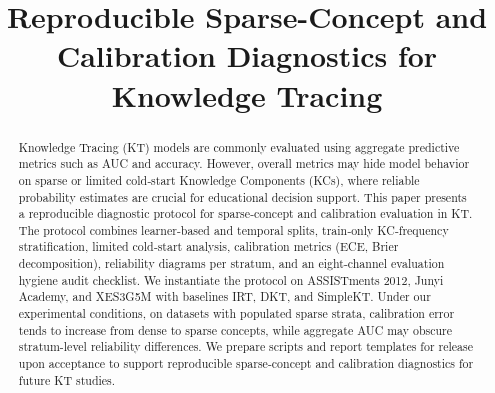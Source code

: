 \documentclass[conference]{IEEEtran}
\begin{document}
\title{Reproducible Sparse-Concept and Calibration Diagnostics for Knowledge Tracing\\
}

\author{
}


\maketitle

\begin{abstract}
Knowledge Tracing (KT) models are commonly evaluated using aggregate predictive metrics such as AUC and accuracy. However, overall metrics may hide model behavior on sparse or limited cold‑start Knowledge Components (KCs), where reliable probability estimates are crucial for educational decision support. This paper presents a reproducible diagnostic protocol for sparse‑concept and calibration evaluation in KT. The protocol combines learner‑based and temporal splits, train‑only KC‑frequency stratification, limited cold‑start analysis, calibration metrics (ECE, Brier decomposition), reliability diagrams per stratum, and an eight‑channel evaluation hygiene audit checklist. We instantiate the protocol on ASSISTments 2012, Junyi Academy, and XES3G5M with baselines IRT, DKT, and SimpleKT. Under our experimental conditions, on datasets with populated sparse strata, calibration error tends to increase from dense to sparse concepts, while aggregate AUC may obscure stratum-level reliability differences. We prepare scripts and report templates for release upon acceptance to support reproducible sparse‑concept and calibration diagnostics for future KT studies.
\end{abstract}
\end{document}
